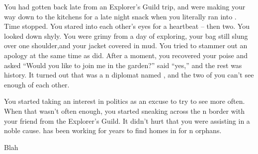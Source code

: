 \documentclass[char]{NeptuneBall}
\begin{document}
You had gotten back late from an Explorer's Guild trip, and were making your way down to the kitchens for a late night snack when you literally ran into \emph{\cDiplomat{\them}}. Time stopped. You stared into each other's eyes for a heartbeat -- then two. You looked down shyly. You were grimy from a day of exploring, your bag still slung over one shoulder,and your jacket covered in mud. You tried to stammer out an apology at the same time as \cDiplomat{\they} did. After a moment, you recovered your poise and asked ``Would you like to join me in the garden?'' \cDiplomat{\They} said ``yes,'' and the rest was history.  It turned out that \cDiplomat{\they} was a \pPacifica{}n diplomat named \cDiplomat{}, and the two of you can't see enough of each other. 

You started taking an interest in politics as an excuse to try to see \cDiplomat{\them} more often. When that wasn't often enough, you started sneaking across the \pPacifica{}n border with your friend \cPriest{} from the Explorer's Guild. It didn't hurt that you were assisting in a noble cause. \cPriest{} has been working for years to find homes in \pPacifica{} for \pAtlantis{}n orphans.

\begin{itemz}[Goals]
  \item Blah
\end{itemz}

\begin{contacts}
  \contact{}
\end{contacts}
\end{document}
